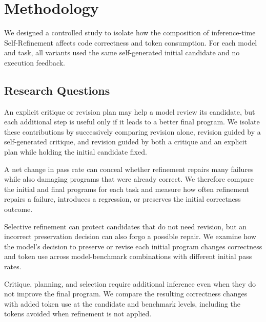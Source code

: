 \section{Methodology}

We designed a controlled study to isolate how the composition of inference-time Self-Refinement affects code correctness and token consumption.
For each model and task, all variants used the same self-generated initial candidate and no execution feedback.

\subsection{Research Questions}

An explicit critique or revision plan may help a model review its candidate, but each additional step is useful only if it leads to a better final program.
We isolate these contributions by successively comparing revision alone, revision guided by a self-generated critique, and revision guided by both a critique and an explicit plan while holding the initial candidate fixed.

A net change in pass rate can conceal whether refinement repairs many failures while also damaging programs that were already correct.
We therefore compare the initial and final programs for each task and measure how often refinement repairs a failure, introduces a regression, or preserves the initial correctness outcome.

Selective refinement can protect candidates that do not need revision, but an incorrect preservation decision can also forgo a possible repair.
We examine how the model's decision to preserve or revise each initial program changes correctness and token use across model-benchmark combinations with different initial pass rates.

Critique, planning, and selection require additional inference even when they do not improve the final program.
We compare the resulting correctness changes with added token use at the candidate and benchmark levels, including the tokens avoided when refinement is not applied.

